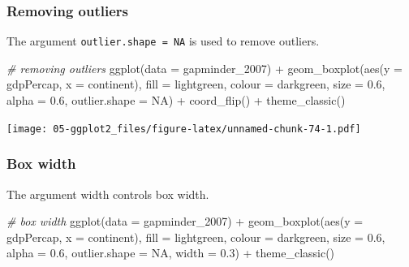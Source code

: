 \documentclass[
]{book}
\newenvironment{Shaded}{\begin{snugshade}}{\end{snugshade}}
\newcommand{\AttributeTok}[1]{\textcolor[rgb]{0.77,0.63,0.00}{#1}}
\newcommand{\CommentTok}[1]{\textcolor[rgb]{0.56,0.35,0.01}{\textit{#1}}}
\newcommand{\ConstantTok}[1]{\textcolor[rgb]{0.00,0.00,0.00}{#1}}
\newcommand{\FloatTok}[1]{\textcolor[rgb]{0.00,0.00,0.81}{#1}}
\newcommand{\FunctionTok}[1]{\textcolor[rgb]{0.00,0.00,0.00}{#1}}
\newcommand{\NormalTok}[1]{#1}
\newcommand{\SpecialCharTok}[1]{\textcolor[rgb]{0.00,0.00,0.00}{#1}}
\newcommand{\StringTok}[1]{\textcolor[rgb]{0.31,0.60,0.02}{#1}}
\begin{document}
\hypertarget{removing-outliers}{%
\subsubsection{Removing outliers}\label{removing-outliers}}

The argument \texttt{outlier.shape\ =\ NA} is used to remove outliers.

\begin{Shaded}
\begin{Highlighting}[]
\CommentTok{\# removing outliers}
\FunctionTok{ggplot}\NormalTok{(}\AttributeTok{data =}\NormalTok{ gapminder\_2007) }\SpecialCharTok{+} 
   \FunctionTok{geom\_boxplot}\NormalTok{(}\FunctionTok{aes}\NormalTok{(}\AttributeTok{y =}\NormalTok{ gdpPercap, }\AttributeTok{x =}\NormalTok{ continent), }
                \AttributeTok{fill =} \StringTok{\textquotesingle{}lightgreen\textquotesingle{}}\NormalTok{, }
                \AttributeTok{colour =} \StringTok{\textquotesingle{}darkgreen\textquotesingle{}}\NormalTok{, }
                \AttributeTok{size =} \FloatTok{0.6}\NormalTok{, }
                \AttributeTok{alpha =} \FloatTok{0.6}\NormalTok{, }
                \AttributeTok{outlier.shape =} \ConstantTok{NA}\NormalTok{) }\SpecialCharTok{+}
   \FunctionTok{coord\_flip}\NormalTok{() }\SpecialCharTok{+}
   \FunctionTok{theme\_classic}\NormalTok{()}
\end{Highlighting}
\end{Shaded}

\texttt{[image: 05-ggplot2\_files/figure-latex/unnamed-chunk-74-1.pdf]}

\hypertarget{box-width}{%
\subsubsection{Box width}\label{box-width}}

The argument width controls box width.

\begin{Shaded}
\begin{Highlighting}[]
\CommentTok{\# box width}
\FunctionTok{ggplot}\NormalTok{(}\AttributeTok{data =}\NormalTok{ gapminder\_2007) }\SpecialCharTok{+} 
   \FunctionTok{geom\_boxplot}\NormalTok{(}\FunctionTok{aes}\NormalTok{(}\AttributeTok{y =}\NormalTok{ gdpPercap, }\AttributeTok{x =}\NormalTok{ continent), }
                \AttributeTok{fill =} \StringTok{\textquotesingle{}lightgreen\textquotesingle{}}\NormalTok{, }
                \AttributeTok{colour =} \StringTok{\textquotesingle{}darkgreen\textquotesingle{}}\NormalTok{, }
                \AttributeTok{size =} \FloatTok{0.6}\NormalTok{, }
                \AttributeTok{alpha =} \FloatTok{0.6}\NormalTok{, }
                \AttributeTok{outlier.shape =} \ConstantTok{NA}\NormalTok{, }
                \AttributeTok{width =} \FloatTok{0.3}\NormalTok{) }\SpecialCharTok{+}
   \FunctionTok{theme\_classic}\NormalTok{()}
\end{Highlighting}
\end{Shaded}
\end{document}
